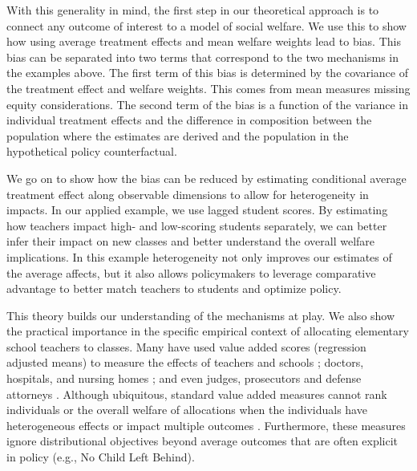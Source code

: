 \documentclass[12pt]{article}
\theoremstyle{definition}
\theoremstyle{definition}
\theoremstyle{definition}
\theoremstyle{definition}
\begin{document}
With this generality in mind, the first step in our theoretical approach is to connect any outcome of interest to a model of social welfare. We use this to show how using average treatment effects and mean welfare weights lead to bias. This bias can be separated into two terms that correspond to the two mechanisms in the examples above. The first term of this bias is determined by the covariance of the treatment effect and welfare weights. This comes from mean measures missing equity considerations. The second term of the bias is a function of the variance in individual treatment effects and the difference in composition between the population where the estimates are derived and the population in the hypothetical policy counterfactual.

We go on to show how the bias can be reduced by estimating conditional average treatment effect along observable dimensions to allow for heterogeneity in impacts. In our applied example, we use lagged student scores. By estimating how teachers impact high- and low-scoring students separately, we can better infer their impact on new classes and better understand the overall welfare implications. In this example heterogeneity not only improves our estimates of the average affects, but it also allows policymakers to leverage comparative advantage to better match teachers to students and optimize policy. 

This theory builds our understanding of the mechanisms at play. We also  show the practical importance in the specific empirical context of allocating elementary school teachers to classes. Many have used value added scores (regression adjusted means) to measure the effects of teachers and schools \citep[see reviews in][]{angrist2022methods,bacher2022estimation}; doctors, hospitals, and nursing homes \citep{chandra2016health,doyle2019evaluating,hull2020hosptial,einav2022producing,chan2022selection}; and even judges, prosecutors and defense attorneys \citep{abrams2007luck,norris2019examiner,harrington2023prosecutor}. Although ubiquitous, standard value added measures cannot rank individuals or the overall welfare of allocations when the individuals have heterogeneous effects or impact multiple outcomes \citep{condie2014teacher}. Furthermore, these measures ignore distributional objectives beyond average outcomes that are often explicit in policy (e.g., No Child Left Behind).




\end{document}

